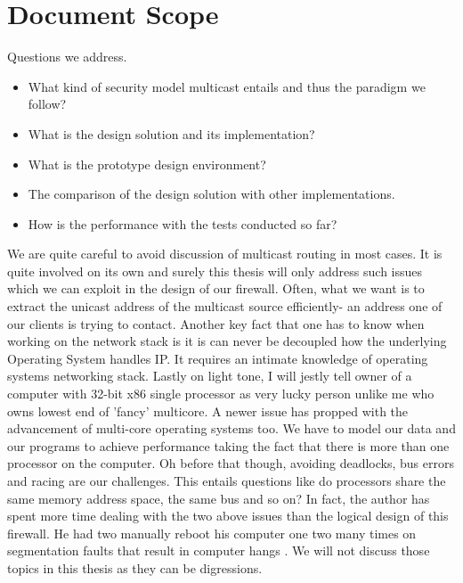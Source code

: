 \documentclass[11pt,left=2cm,bottom=2cm,oneside]{book}
\begin{document}
\section{Document Scope}
Questions we address.
\begin{itemize}
\item What kind of security model multicast entails and thus the paradigm we
follow?
\item What is the design solution and its implementation?
\item What is the prototype design environment?
\item The comparison of the design solution with other implementations.
\item How is the performance with the tests conducted so far?
\end{itemize}
We are quite careful to avoid discussion of multicast routing in most cases.
It is
quite involved on its own and surely this thesis will only address such issues
which
we can exploit in the design of our firewall. Often, what we want is to
extract the
unicast address of the multicast source efficiently- an address one of our
clients is
trying to contact.
Another key fact that one has to know when working on the network stack is
it is can never be decoupled how the underlying Operating System handles IP.
It
requires an intimate knowledge of operating systems networking stack.
Lastly on light tone, I will jestly tell owner of a computer with 32-bit x86
single
processor as very lucky person unlike me who owns lowest end of 'fancy'
multicore.
A newer issue has propped with the advancement of multi-core operating systems
too. We have to model our data and our programs to achieve performance taking
the fact that there is more than one processor on the computer. Oh before that
though, avoiding deadlocks, bus errors and racing are our challenges. This
entails
questions like do processors share the same memory address space, the same bus
and so on? In fact, the author has spent more time dealing with the two above
issues
than the logical design of this firewall. He had two manually reboot his
computer
one two many times on segmentation faults that result in computer hangs . We
will not discuss those topics in this thesis as they can be digressions.
\end{document}
